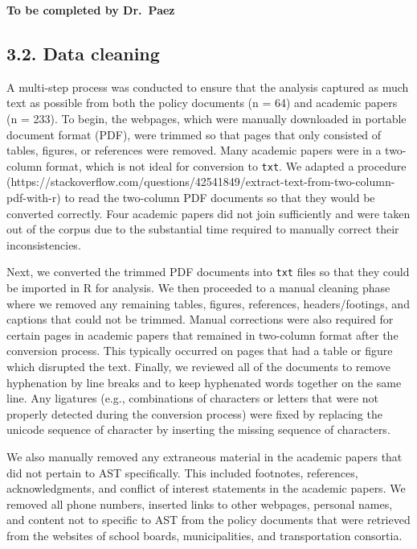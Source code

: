 \documentclass[]{elsarticle} %
\begin{document}
\textbf{To be completed by Dr.~Paez}

\hypertarget{data-cleaning}{%
\subsection{3.2. Data cleaning}\label{data-cleaning}}

A multi-step process was conducted to ensure that the analysis captured
as much text as possible from both the policy documents (n = 64) and
academic papers (n = 233). To begin, the webpages, which were manually
downloaded in portable document format (PDF), were trimmed so that pages
that only consisted of tables, figures, or references were removed. Many
academic papers were in a two-column format, which is not ideal for
conversion to \texttt{txt}. We adapted a procedure
(https://stackoverflow.com/questions/42541849/extract-text-from-two-column-pdf-with-r)
to read the two-column PDF documents so that they would be converted
correctly. Four academic papers did not join sufficiently and were taken
out of the corpus due to the substantial time required to manually
correct their inconsistencies.

Next, we converted the trimmed PDF documents into \texttt{txt} files so
that they could be imported in R for analysis. We then proceeded to a
manual cleaning phase where we removed any remaining tables, figures,
references, headers/footings, and captions that could not be trimmed.
Manual corrections were also required for certain pages in academic
papers that remained in two-column format after the conversion process.
This typically occurred on pages that had a table or figure which
disrupted the text. Finally, we reviewed all of the documents to remove
hyphenation by line breaks and to keep hyphenated words together on the
same line. Any ligatures (e.g., combinations of characters or letters
that were not properly detected during the conversion process) were
fixed by replacing the unicode sequence of character by inserting the
missing sequence of characters.

We also manually removed any extraneous material in the academic papers
that did not pertain to AST specifically. This included footnotes,
references, acknowledgments, and conflict of interest statements in the
academic papers. We removed all phone numbers, inserted links to other
webpages, personal names, and content not to specific to AST from the
policy documents that were retrieved from the websites of school boards,
municipalities, and transportation consortia.
\end{document}
